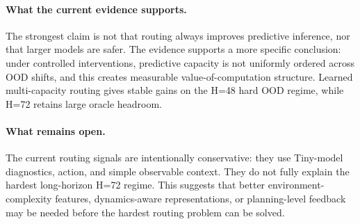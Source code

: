 \paragraph{What the current evidence supports.}
The strongest claim is not that routing always improves predictive inference, nor that larger models are safer. The evidence supports a more specific conclusion: under controlled interventions, predictive capacity is not uniformly ordered across OOD shifts, and this creates measurable value-of-computation structure. Learned multi-capacity routing gives stable gains on the H=48 hard OOD regime, while H=72 retains large oracle headroom.

\paragraph{What remains open.}
The current routing signals are intentionally conservative: they use Tiny-model diagnostics, action, and simple observable context. They do not fully explain the hardest long-horizon H=72 regime. This suggests that better environment-complexity features, dynamics-aware representations, or planning-level feedback may be needed before the hardest routing problem can be solved.
